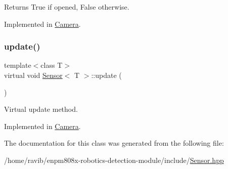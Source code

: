 \begin{DoxyReturn}{Returns}
True if opened, False otherwise. 
\end{DoxyReturn}


Implemented in \hyperlink{class_camera_a635f36e95291ad8962a6b85bf2a12def}{Camera}.

\mbox{\label{class_sensor_a1766329f3c9918fa886ead46b141a6a8}} 
\subsubsection{\texorpdfstring{update()}{update()}}
{\footnotesize\ttfamily template$<$class T$>$ \\
virtual void \hyperlink{class_sensor}{Sensor}$<$ T $>$\+::update (\begin{DoxyParamCaption}{ }\end{DoxyParamCaption})\hspace{0.3cm}{\ttfamily [pure virtual]}}



Virtual update method. 



Implemented in \hyperlink{class_camera_ae957cc994193c4a367d1e592a16a477f}{Camera}.



The documentation for this class was generated from the following file\+:\begin{DoxyCompactItemize}
\item 
/home/ravib/enpm808x-\/robotics-\/detection-\/module/include/\hyperlink{_sensor_8hpp}{Sensor.\+hpp}\end{DoxyCompactItemize}
